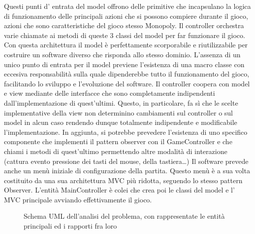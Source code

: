 Questi punti d’ entrata del model offrono delle primitive che incapsulano la logica di funzionamento 
delle principali azioni che si possono compiere durante il gioco, azioni che sono caratteristiche del 
gioco stesso Monopoly. Il controller orchestra varie chiamate ai metodi di queste 3 classi del model per far funzionare
il gioco.
Con questa architettura il model è perfettamente scorporabile e riutilizzabile per costruire 
un software diverso che risponda allo stesso dominio. L'assenza di un unico punto di entrata per il model
previene l'esistenza di una macro classe con eccesiva responsabilità sulla quale dipenderebbe tutto il funzionamento
del gioco, facilitando lo sviluppo e l'evoluzione del software.\newline
Il controller coopera con model e view mediante delle interfacce che sono completamente indipendenti 
dall’implementazione di quest’ultimi. 
Questo, in particolare, fa sì che le scelte implementative della view non determinino cambiamenti sul 
controller o sul model in alcun caso rendendo dunque totalmente
indipendente e modificabile l'implementazione.
In aggiunta, si potrebbe prevedere l'esistenza di uno specifico componente che implementi il pattern observer con il GameController
e che chiami i metodi di quest'ultimo permettendo altre modalità di interazione (cattura evento pressione dei tasti del mouse, della tastiera\dots)
Il software prevede anche un menù iniziale di configurazione della partita. 
Questo menù è a sua volta costituito da una sua architettura MVC più ridotta, 
seguendo lo stesso pattern Observer. 
L’entità MainController è colei che crea poi le classi del model e l' MVC principale avviando effettivamente il gioco.

\begin{figure}[H]
    \centering
    \caption{Schema UML dell'analisi del problema, con rappresentate le entità principali ed i rapporti fra loro}
	\label{img:architecture_diagram}
\end{figure}
